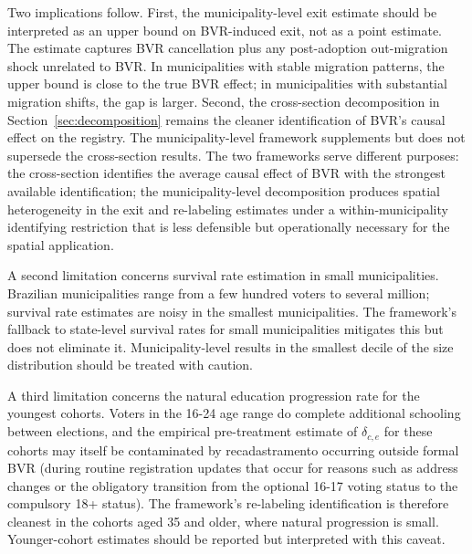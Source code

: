 Two implications follow. First, the municipality-level exit estimate should be interpreted as an upper bound on BVR-induced exit, not as a point estimate. The estimate captures BVR cancellation plus any post-adoption out-migration shock unrelated to BVR. In municipalities with stable migration patterns, the upper bound is close to the true BVR effect; in municipalities with substantial migration shifts, the gap is larger. Second, the cross-section decomposition in Section~\ref{sec:decomposition} remains the cleaner identification of BVR's causal effect on the registry. The municipality-level framework supplements but does not supersede the cross-section results. The two frameworks serve different purposes: the cross-section identifies the average causal effect of BVR with the strongest available identification; the municipality-level decomposition produces spatial heterogeneity in the exit and re-labeling estimates under a within-municipality identifying restriction that is less defensible but operationally necessary for the spatial application.

A second limitation concerns survival rate estimation in small municipalities. Brazilian municipalities range from a few hundred voters to several million; survival rate estimates are noisy in the smallest municipalities. The framework's fallback to state-level survival rates for small municipalities mitigates this but does not eliminate it. Municipality-level results in the smallest decile of the size distribution should be treated with caution.

A third limitation concerns the natural education progression rate for the youngest cohorts. Voters in the 16-24 age range do complete additional schooling between elections, and the empirical pre-treatment estimate of $\delta_{c,e}$ for these cohorts may itself be contaminated by recadastramento occurring outside formal BVR (during routine registration updates that occur for reasons such as address changes or the obligatory transition from the optional 16-17 voting status to the compulsory 18+ status). The framework's re-labeling identification is therefore cleanest in the cohorts aged 35 and older, where natural progression is small. Younger-cohort estimates should be reported but interpreted with this caveat.

